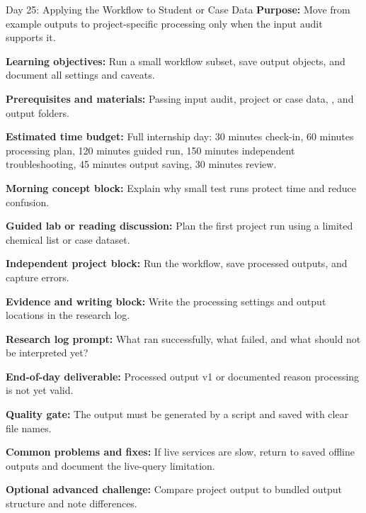 \begin{dailybox}{Day 25: Applying the Workflow to Student or Case Data}
\textbf{Purpose:} Move from example outputs to project-specific processing only when the input audit supports it.

\textbf{Learning objectives:} Run a small workflow subset, save output objects, and document all settings and caveats.

\textbf{Prerequisites and materials:} Passing input audit, project or case data, , and output folders.

\textbf{Estimated time budget:} Full internship day: 30 minutes check-in, 60 minutes processing plan, 120 minutes guided run, 150 minutes independent troubleshooting, 45 minutes output saving, 30 minutes review.

\textbf{Morning concept block:} Explain why small test runs protect time and reduce confusion.

\textbf{Guided lab or reading discussion:} Plan the first project run using a limited chemical list or case dataset.

\textbf{Independent project block:} Run the workflow, save processed outputs, and capture errors.

\textbf{Evidence and writing block:} Write the processing settings and output locations in the research log.

\textbf{Research log prompt:} What ran successfully, what failed, and what should not be interpreted yet?

\textbf{End-of-day deliverable:} Processed output v1 or documented reason processing is not yet valid.

\textbf{Quality gate:} The output must be generated by a script and saved with clear file names.

\textbf{Common problems and fixes:} If live services are slow, return to saved offline outputs and document the live-query limitation.

\textbf{Optional advanced challenge:} Compare project output to bundled output structure and note differences.
\end{dailybox}

